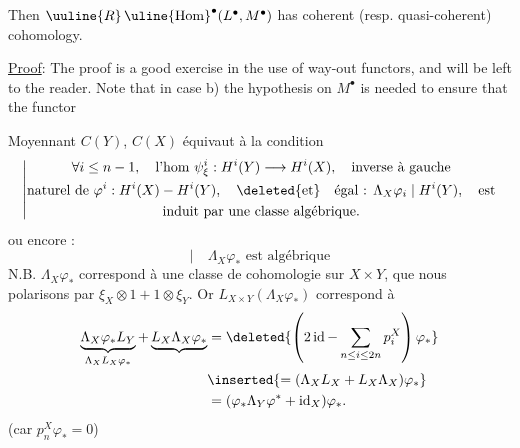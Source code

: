 Then $\uuline{R}\,\uline{\operatorname{Hom}}^\bullet(L^\bullet,M^\bullet)$ has coherent (resp. quasi-coherent) cohomology.

\uline{Proof}: The proof is a good exercise in the use of way-out functors, and will be left to the reader. Note that in case b) the hypothesis on $M^\bullet$ is needed to ensure that the functor

Moyennant $C(Y)$, $C(X)$ équivaut à la condition
\[
\left|\begin{gathered}
\forall i\leq n-1,\quad\text{l'hom }\psi_\xi^i:H^i(Y)\longrightarrow H^i(X),\quad\text{inverse à gauche}\\
\text{naturel de }\varphi^i:H^i(X)\mathbin{-}H^i(Y),\quad\deleted{\text{et}}\quad\text{égal : }\Lambda_X\varphi_{i}\mid H^i(Y),\quad\text{est}\\
\text{induit par une classe algébrique.}
\end{gathered}\right.
\]
ou encore :
\[
\left|\quad\Lambda_X\varphi_*\text{ est algébrique}\right.
\]
\quad N.B. $\Lambda_X\varphi_*$ correspond à une classe de cohomologie
sur $X\times Y$, que nous polarisons par $\xi_X\otimes1+1\otimes\xi_Y$.
Or  $L_{X\times Y}(\Lambda_X\varphi_*)$ correspond à
\[
\begin{aligned}
\underbrace{\Lambda_X\varphi_*L_Y}_{\Lambda_XL_X\varphi_*}
 +\underbrace{L_X\Lambda_X\varphi_*}
 &=\deleted{\left(2\operatorname{id}-\sum_{n\leq i\leq2n}p_i^X\right)\varphi_*}\\
 &\inserted{=(\Lambda_XL_X+L_X\Lambda_X)\varphi_*}\\
 &=(\varphi_*\Lambda_Y\varphi^*+\operatorname{id}_X)\varphi_*.
\end{aligned}
\]
(car $p_n^X\varphi_*=0$)

